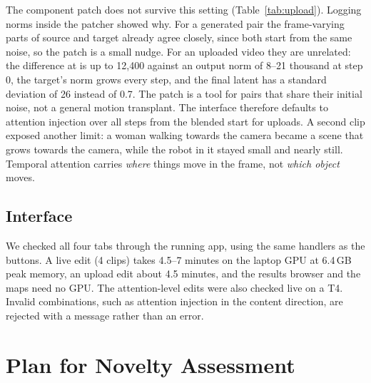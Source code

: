 \documentclass[twoside,english]{article}
\begin{document}
The component patch does not survive this setting (Table~\ref{tab:upload}). Logging norms inside the
patcher showed why. For a generated pair the frame-varying parts of source and target already agree
closely, since both start from the same noise, so the patch is a small nudge. For an uploaded video they
are unrelated: the difference at  is up to 12{,}400 against an output norm of 8--21
thousand at step 0, the target's norm grows every step, and the final latent has a standard deviation of
26 instead of 0.7. The patch is a tool for pairs that share their initial noise, not a general motion
transplant. The interface therefore defaults to attention injection over all steps from the blended start
for uploads. A second clip exposed another limit: a woman walking towards the camera became a scene that
grows towards the camera, while the robot in it stayed small and nearly still. Temporal attention carries
\emph{where} things move in the frame, not \emph{which object} moves.

\subsection{Interface}

We checked all four tabs through the running app, using the same handlers as the buttons. A live edit (4
clips) takes 4.5--7 minutes on the laptop GPU at 6.4\,GB peak memory, an upload edit about 4.5 minutes,
and the results browser and the maps need no GPU. The attention-level edits were also checked live on a
T4. Invalid combinations, such as attention injection in the content direction, are rejected with a
message rather than an error.

\section{Plan for Novelty Assessment} \label{sec:Plan for Novelty Assessment}
\end{document}
